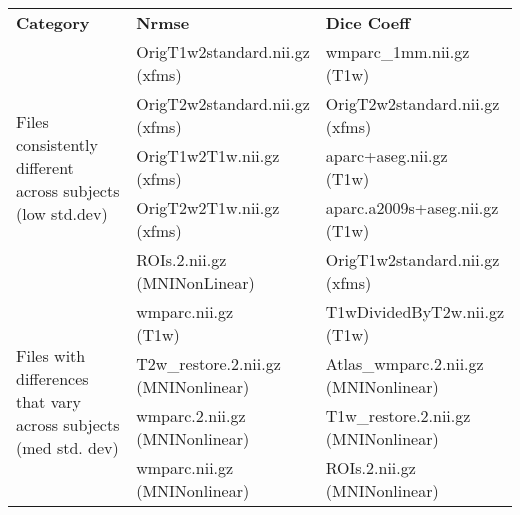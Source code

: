 \iffalse
\begin{center}
\begin{longtable}{|p{}|p{}|p{}|}
\cline{1-3}
\textbf{Category} & \textbf{Nrmse} & \textbf{Dice Coeff} \\\cline{1-3}
\multirow{5}{.3\textwidth}{Files consistently different across subjects (low std.dev)}     & \makecell[l]{OrigT1w2standard.nii.gz \\ (xfms)}  & \makecell[l]{wmparc\_1mm.nii.gz\\(T1w)} \\\cline{2-3}
& \makecell[l]{OrigT2w2standard.nii.gz\\(xfms)}                   & \makecell[l]{OrigT2w2standard.nii.gz\\(xfms)} \\\cline{2-3}
& \makecell[l]{OrigT1w2T1w.nii.gz\\(xfms)}                        & \makecell[l]{aparc+aseg.nii.gz\\(T1w)} \\\cline{2-3}
& \makecell[l]{OrigT2w2T1w.nii.gz\\(xfms)}                        & \makecell[l]{aparc.a2009s+aseg.nii.gz\\(T1w)} \\\cline{2-3}
& \makecell[l]{ROIs.2.nii.gz\\(MNINonLinear)}                     & \makecell[l]{OrigT1w2standard.nii.gz\\(xfms)} \\\cline{1-3}
\multirow{5}{.3\textwidth}{Files with differences that vary across subjects (med std. dev)} & \makecell[l]{wmparc.nii.gz\\(T1w)}  & \makecell[l]{T1wDividedByT2w.nii.gz\\(T1w)} \\\cline{2-3}
& \makecell[l]{T2w\_restore.2.nii.gz\\(MNINonlinear)}                       & \makecell[l]{Atlas\_wmparc.2.nii.gz\\(MNINonlinear)} \\\cline{2-3}
& \makecell[l]{wmparc.2.nii.gz\\(MNINonlinear)}                           & \makecell[l]{T1w\_restore.2.nii.gz\\(MNINonlinear)} \\\cline{2-3}
& \makecell[l]{wmparc.nii.gz\\(MNINonlinear)}                      & \makecell[l]{ROIs.2.nii.gz\\(MNINonlinear)} \\\cline{2-3}

\end{longtable}
\end{center}
